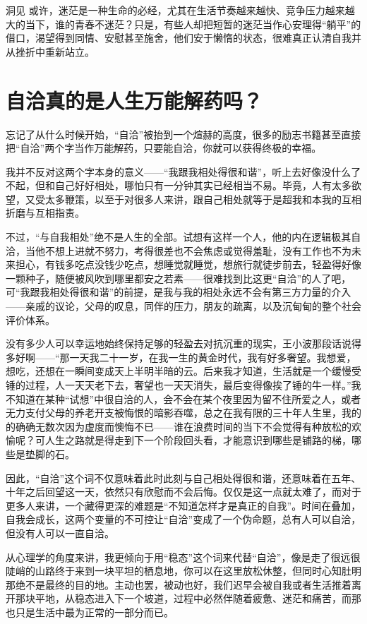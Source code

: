 \begin{quoteBox}{洞见}
或许，迷茫是一种生命的必经，尤其在生活节奏越来越快、竞争压力越来越大的当下，谁的青春不迷茫？只是，有些人却把短暂的迷茫当作心安理得“躺平”的借口，渴望得到同情、安慰甚至施舍，他们安于懒惰的状态，很难真正认清自我并从挫折中重新站立。
\end{quoteBox}

\clearpage
\section*{自洽真的是人生万能解药吗？}

忘记了从什么时候开始，“自洽”被抬到一个煊赫的高度，很多的励志书籍甚至直接把“自洽”两个字当作万能解药，只要能自洽，你就可以获得终极的幸福。

我并不反对这两个字本身的意义——“我跟我相处得很和谐”，听上去好像没什么了不起，但和自己好好相处，哪怕只有一分钟其实已经相当不易。毕竟，人有太多欲望，又受太多鞭策，以至于对很多人来讲，跟自己相处就等于是超我和本我的互相折磨与互相指责。

不过，“与自我相处”绝不是人生的全部。试想有这样一个人，他的内在逻辑极其自洽，当他不想上进就不努力，考得很差也不会焦虑或觉得羞耻，没有工作也不为未来担心，有钱多吃点没钱少吃点，想睡觉就睡觉，想旅行就徒步前去，轻盈得好像一颗种子，随便被风吹到哪里都安之若素——很难找到比这更“自洽”的人了吧，可“我跟我相处得很和谐”的前提，是我与我的相处永远不会有第三方力量的介入——亲戚的议论，父母的叹息，同伴的压力，朋友的疏离，以及沉甸甸的整个社会评价体系。

没有多少人可以幸运地始终保持足够的轻盈去对抗沉重的现实，王小波那段话说得多好啊——“那一天我二十一岁，在我一生的黄金时代，我有好多奢望。我想爱，想吃，还想在一瞬间变成天上半明半暗的云。后来我才知道，生活就是一个缓慢受锤的过程，人一天天老下去，奢望也一天天消失，最后变得像挨了锤的牛一样。”我不知道在某种“试想”中很自洽的人，会不会在某个夜里因为留不住所爱之人，或者无力支付父母的养老开支被悔恨的暗影吞噬，总之在我有限的三十年人生里，我的的确确无数次因为虚度而懊悔不已——谁在浪费时间的当下不会觉得有种放松的欢愉呢？可人生之路就是得走到下一个阶段回头看，才能意识到哪些是铺路的梯，哪些是垫脚的石。

因此，“自洽”这个词不仅意味着此时此刻与自己相处得很和谐，还意味着在五年、十年之后回望这一天，依然只有欣慰而不会后悔。仅仅是这一点就太难了，而对于更多人来讲，一个藏得更深的难题是“不知道怎样才是真正的自我”。时间在叠加，自我会成长，这两个变量的不可控让“自洽”变成了一个伪命题，总有人可以自洽，但没有人可以一直自洽。

从心理学的角度来讲，我更倾向于用“稳态”这个词来代替“自洽”，像是走了很远很陡峭的山路终于来到一块平坦的栖息地，你可以在这里放松休整，但同时心知肚明那绝不是最终的目的地。主动也罢，被动也好，我们迟早会被自我或者生活推着离开那块平地，从稳态进入下一个坡道，过程中必然伴随着疲惫、迷茫和痛苦，而那也只是生活中最为正常的一部分而已。

